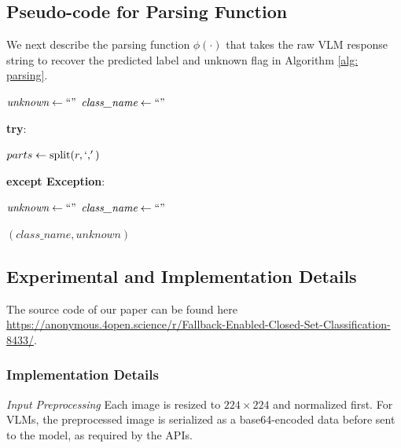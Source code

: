 \documentclass[10pt]{article} %
\begin{document}
\subsection{Pseudo-code for Parsing Function} \label{apx: parsing function}
We next describe the parsing function $\phi(\cdot)$ that takes the raw VLM response string to recover the predicted label and unknown flag in Algorithm \ref{alg: parsing}.

\begin{algorithm}[t] 
\caption{Parse VLM Response}
\label{alg: parsing}

$\textit{unknown} \gets ``"$\;
$\textit{class\_name} \gets ``"$\;

\textbf{try}:

{
    $parts \gets \text{split}(r, `,')$ 
    
}
\textbf{except Exception}:

{
    $\textit{unknown} \gets ``"$\;
    $\textit{class\_name} \gets ``"$\;
}

\Return $(\textit{class\_name}, \textit{unknown})$ \;

\end{algorithm}

\subsection{Experimental and Implementation Details} \label{apx: experimental details}
The source code of our paper can be found here \url{https://anonymous.4open.science/r/Fallback-Enabled-Closed-Set-Classification-8433/}.
\subsubsection{Implementation Details} \label{apx: implementation details}
{\em Input Preprocessing} Each image is resized to $224 \times 224$ and normalized first. For VLMs, the preprocessed image is serialized as a base64-encoded data before sent to the model, as required by the APIs.
\end{document}

